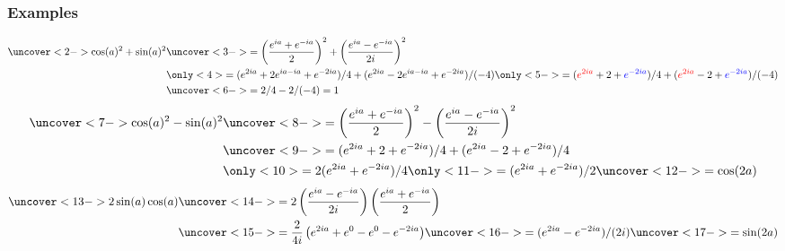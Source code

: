 \documentclass[9pt]{beamer}
\begin{document}
\begin{frame}[t]
 \frametitle{Examples}
 \vspace{-4ex}
 \begin{align*}
  \uncover<2->{\cos(a)^2+\sin(a)^2 }
  &\uncover<3->{= \left(\frac{e^{ia}+e^{-ia}}{2}\right)^2 + 
   \left(\frac{e^{ia}-e^{-ia}}{2i}\right)^2
   \hphantom{mmmmmmmmmmmmmmm}} \\
  &%
\ifx\HO\undefined
  \only<4>{= (e^{2ia}+2e^{ia-ia}+e^{-2ia})/4 + 
   (e^{2ia}-2e^{ia-ia}+e^{-2ia})/(-4)}%
\fi%
  \only<5->{= (\RED{e^{2ia}}+2+\BLUE{e^{-2ia}})/4 + 
   (\RED{e^{2ia}}-2+\BLUE{e^{-2ia}})/(-4)} \\
  &\uncover<6->{= 2/4 - 2/(-4) = 1}
 \end{align*}
 \vspace{-2ex}
 \begin{align*}
  \uncover<7->{\cos(a)^2-\sin(a)^2 }
  &\uncover<8->{= \left(\frac{e^{ia}+e^{-ia}}{2}\right)^2 - 
   \left(\frac{e^{ia}-e^{-ia}}{2i}\right)^2
   \hphantom{mmmmmmmmmmmmmmm}} \\
  &\uncover<9->{= (e^{2ia}+2+e^{-2ia})/4 + 
   (e^{2ia}-2+e^{-2ia})/4} \\
  &%
\ifx\HO\undefined
  \only<10>{= 2(e^{2ia}+e^{-2ia})/4}
\fi
  \only<11->{= (e^{2ia}+e^{-2ia})/2}
  \uncover<12->{=\cos(2a)}
 \end{align*}
 \vspace{-2ex}
 \begin{align*}
  \uncover<13->{2\sin(a)\cos(a)}
  &\uncover<14->{= 2\left(\frac{e^{ia}-e^{-ia}}{2i}\right)
   \left(\frac{e^{ia}+e^{-ia}}{2}\right)} \\
  &\uncover<15->{= \frac{2}{4i}\left(e^{2ia}+e^0-e^0-e^{-2ia}\right)}
  \uncover<16->{= (e^{2ia}-e^{-2ia})/(2i)}\uncover<17->{ = \sin(2a)}
 \end{align*}
\end{frame}
\end{document}
